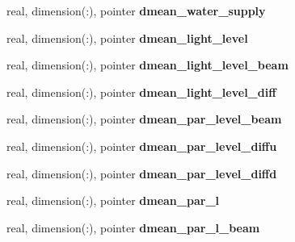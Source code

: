 \begin{DoxyCompactItemize}
\item 
\hypertarget{structed__state__vars_1_1patchtype_ac41f4180c8a27056541314fdf7bd980e}{
real, dimension(:), pointer {\bfseries dmean\_\-water\_\-supply}}
\label{structed__state__vars_1_1patchtype_ac41f4180c8a27056541314fdf7bd980e}

\item 
\hypertarget{structed__state__vars_1_1patchtype_ae50e2c1de5eb48ebeb4ca5f4ef471f93}{
real, dimension(:), pointer {\bfseries dmean\_\-light\_\-level}}
\label{structed__state__vars_1_1patchtype_ae50e2c1de5eb48ebeb4ca5f4ef471f93}

\item 
\hypertarget{structed__state__vars_1_1patchtype_ae72eeccface4ded662481178fd72b8ab}{
real, dimension(:), pointer {\bfseries dmean\_\-light\_\-level\_\-beam}}
\label{structed__state__vars_1_1patchtype_ae72eeccface4ded662481178fd72b8ab}

\item 
\hypertarget{structed__state__vars_1_1patchtype_af5a62ae45c91e48d027aca70a98b1a79}{
real, dimension(:), pointer {\bfseries dmean\_\-light\_\-level\_\-diff}}
\label{structed__state__vars_1_1patchtype_af5a62ae45c91e48d027aca70a98b1a79}

\item 
\hypertarget{structed__state__vars_1_1patchtype_a7d1949f93a5f8c568173867241ae91dc}{
real, dimension(:), pointer {\bfseries dmean\_\-par\_\-level\_\-beam}}
\label{structed__state__vars_1_1patchtype_a7d1949f93a5f8c568173867241ae91dc}

\item 
\hypertarget{structed__state__vars_1_1patchtype_a1385d17242395b2289bec7863f1e56ab}{
real, dimension(:), pointer {\bfseries dmean\_\-par\_\-level\_\-diffu}}
\label{structed__state__vars_1_1patchtype_a1385d17242395b2289bec7863f1e56ab}

\item 
\hypertarget{structed__state__vars_1_1patchtype_a549102e314d47f66702c97f39631fbc7}{
real, dimension(:), pointer {\bfseries dmean\_\-par\_\-level\_\-diffd}}
\label{structed__state__vars_1_1patchtype_a549102e314d47f66702c97f39631fbc7}

\item 
\hypertarget{structed__state__vars_1_1patchtype_a6777a80ad5c5241d86e959abb50963da}{
real, dimension(:), pointer {\bfseries dmean\_\-par\_\-l}}
\label{structed__state__vars_1_1patchtype_a6777a80ad5c5241d86e959abb50963da}

\item 
\hypertarget{structed__state__vars_1_1patchtype_a8c34717900c9584cbcb1e46d5ed8698e}{
real, dimension(:), pointer {\bfseries dmean\_\-par\_\-l\_\-beam}}
\label{structed__state__vars_1_1patchtype_a8c34717900c9584cbcb1e46d5ed8698e}


\end{DoxyCompactItemize}
